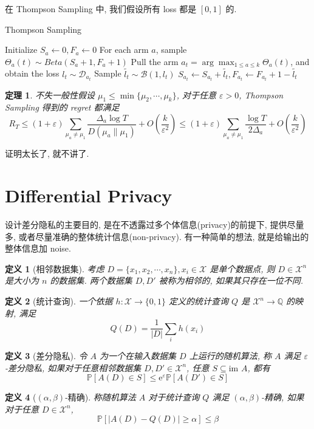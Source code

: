 \documentclass[8pt]{article}
\theoremstyle{compact}
\newtheorem{theorem}{定理}[section]
\newtheorem{definition}{定义}[section]
\def\le{\leqslant}
\def\ge{\geqslant}
\def\im{\text{im }}
\def\P#1{\mathbb{P}\left[{#1}\right]}
\def\e{\mathrm{e}}
\begin{document}
在 Thompson Sampling 中, 我们假设所有 loss 都是 $[0, 1]$ 的.

\begin{algorithm}
	\caption{Thompson Sampling}
	\begin{algorithmic}[1]
		\State Initialize $S_a \gets 0, F_a \gets 0$
			\State For each arm $a$, sample $\Theta_a(t) \sim Beta(S_a + 1, F_a + 1)$
			\State Pull the arm $a_t = \arg \max_{1 \le a \le k}\Theta_a(t)$, and obtain the loss $l_t \sim \mathcal D_{a_t}$ 
			\State Sample $\tilde{l_t} \sim \mathcal B(1, l_t)$ 
			\State $S_{a_t} \gets S_{a_t} + \tilde{l_t}, F_{a_t} \gets F_{a_t} + 1 - \tilde{l_t}$
		\EndFor
	\end{algorithmic}
\end{algorithm}
\begin{theorem}
	不失一般性假设 $\mu_1 \le \min\{\mu_2, \cdots, \mu_k\}$, 对于任意 $\varepsilon > 0$, Thompson Sampling 得到的 regret 都满足 $$R_T \le (1 + \varepsilon)\sum_{\mu_a \neq \mu_1}\frac{\Delta_a\log T}{D(\mu_a \| \mu_1)} + O\left(\frac{k}{\varepsilon^2}\right) \le (1 + \varepsilon)\sum_{\mu_a \neq \mu_1}\frac{\log T}{2\Delta_a} + O\left(\frac{k}{\varepsilon^2}\right)$$
\end{theorem}

证明太长了, 就不讲了.

\section{Differential Privacy}

设计差分隐私的主要目的, 是在不透露过多个体信息(privacy)的前提下, 提供尽量多, 或者尽量准确的整体统计信息(non-privacy). 有一种简单的想法, 就是给输出的整体信息加 noise.

\begin{definition}[相邻数据集]
	考虑 $D = \{x_1, x_2, \cdots, x_n\}, x_i \in \mathcal X$ 是单个数据点, 则 $D \in \mathcal X^n$ 是大小为 $n$ 的数据集. 两个数据集 $D, D'$ 被称为相邻的, 如果其只存在一位不同.
\end{definition}
\begin{definition}[统计查询]
	一个依据 $h: \mathcal X \to \{0, 1\}$ 定义的统计查询 $Q$ 是 $\mathcal X^n \to \mathbb Q$ 的映射, 满足 $$Q(D) = \frac{1}{|D|} \sum_i h(x_i)$$
\end{definition}
\begin{definition}[差分隐私]
	令 $A$ 为一个在输入数据集 $D$ 上运行的随机算法, 称 $A$ 满足 $\varepsilon$-差分隐私, 如果对于任意相邻数据集 $D, D' \in \mathcal X^n$, 任意 $S \subseteq \im A$, 都有 $$\P{A(D) \in S} \le \e^{\varepsilon}\P{A(D') \in S}$$
\end{definition}
\begin{definition}[$(\alpha, \beta)$-精确]
	称随机算法 $A$ 对于统计查询 $Q$ 满足 $(\alpha, \beta)$-精确, 如果对于任意 $D \in \mathcal X^n$, $$\P{|A(D) - Q(D)| \ge \alpha} \le \beta$$
\end{definition}
\end{document}
